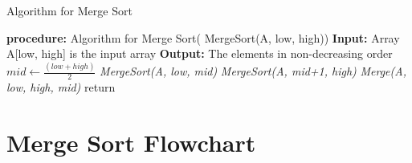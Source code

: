 \documentclass[a4paper, 12pt]{report}
\begin{document}
        \begin{algorithm}
        \caption{Algorithm for Merge Sort}
            \begin{algorithmic}[1]
                \State \textbf{procedure:} Algorithm for Merge Sort( MergeSort(A, low, high))
                \State \textbf{Input:} Array A[low, high] is the input array
                \State \textbf{Output:} The elements in non-decreasing order
                 
                    \State $mid \gets \frac{(low+high)}{2}$ 
                    \State \textit{MergeSort(A, low, mid)} 
                    \State \textit{MergeSort(A, mid+1, high)} 
                    \State \textit{Merge(A, low, high, mid)} 
                \EndIf
                \State return
            \end{algorithmic}
        \end{algorithm}
            
    

    \newpage

    \section{Merge Sort Flowchart}
    
\end{document}
